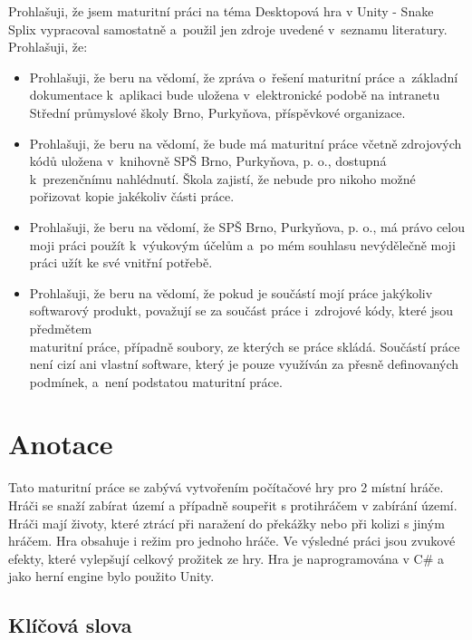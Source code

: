 \documentclass[12pt,a4paper]{report}
\begin{document}
\noindent Prohlašuji, že jsem maturitní práci na téma
Desktopová hra v Unity - Snake Splix vypracoval samostatně
a~použil jen zdroje uvedené v~seznamu literatury.\\
Prohlašuji, že:
\begin{itemize}
    \item Prohlašuji, že beru na vědomí, že zpráva o~řešení maturitní práce
    a~základní dokumentace k~aplikaci bude uložena v~elektronické podobě na
    intranetu Střední průmyslové školy Brno, Purkyňova, příspěvkové organizace.
    \item Prohlašuji, že beru na vědomí, že bude má maturitní práce včetně
    zdrojových kódů uložena v~knihovně SPŠ Brno, Purkyňova, p. o., dostupná
    k~prezenčnímu nahlédnutí. Škola zajistí, že nebude pro nikoho možné
    pořizovat kopie jakékoliv části práce.
    \item Prohlašuji, že beru na vědomí, že SPŠ Brno, Purkyňova, p. o., má právo
    celou moji práci použít k~výukovým účelům a~po mém souhlasu nevýdělečně moji
    práci užít ke své vnitřní potřebě.
    \item Prohlašuji, že beru na vědomí, že pokud je součástí mojí práce
    jakýkoliv softwarový produkt, považují se za součást práce i~zdrojové kódy,
    které jsou předmětem\\maturitní práce, případně soubory, ze kterých se práce
    skládá. Součástí práce není cizí ani vlastní software, který je pouze
    využíván za přesně definovaných podmínek, a~není podstatou maturitní práce.
\end{itemize}

\newpage

\section*{Anotace}

\noindent
Tato maturitní práce se zabývá vytvořením počítačové hry pro 2 místní hráče.
Hráči se snaží zabírat území a případně soupeřit s protihráčem v zabírání území.
Hráči mají životy, které ztrácí při naražení do překážky nebo při kolizi s jiným hráčem.
Hra obsahuje i režim pro jednoho hráče.
Ve výsledné práci jsou zvukové efekty, které vylepšují celkový prožitek ze hry. 
Hra je naprogramována v C\# a jako herní engine bylo použito Unity.


\subsection*{Klíčová slova}
\end{document}
